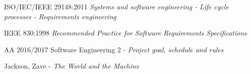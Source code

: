 \begin{thebibliography}{9}

	ISO/IEC/IEEE 29148:2011 \emph{Systems and software engineering - Life cycle processes - Requirements engineering}

	IEEE 830:1998 \emph{Recommended Practice for Software Requirements Specifications}
	
	AA 2016/2017 Software Engineering 2 - \emph{Project goal, schedule and rules}
	
	Jackson, Zave - \textit{The World and the Machine}

\end{thebibliography}
